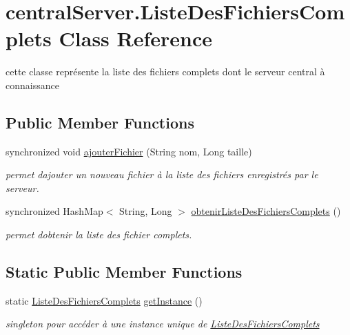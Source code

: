 \hypertarget{classcentralServer_1_1ListeDesFichiersComplets}{}\section{central\+Server.\+Liste\+Des\+Fichiers\+Complets Class Reference}
\label{classcentralServer_1_1ListeDesFichiersComplets}


cette classe représente la liste des fichiers complets dont le serveur central à connaissance  


\subsection*{Public Member Functions}
\begin{DoxyCompactItemize}
\item 
synchronized void \hyperlink{classcentralServer_1_1ListeDesFichiersComplets_a18c22fffc617f151f9ca3400d185dff9}{ajouter\+Fichier} (String nom, Long taille)
\begin{DoxyCompactList}\small\item\em permet d\textquotesingle{}ajouter un nouveau fichier à la liste des fichiers enregistrés par le serveur. \end{DoxyCompactList}\item 
synchronized Hash\+Map$<$ String, Long $>$ \hyperlink{classcentralServer_1_1ListeDesFichiersComplets_a333cc85a4c4d342123ee286b30e7a14e}{obtenir\+Liste\+Des\+Fichiers\+Complets} ()
\begin{DoxyCompactList}\small\item\em permet d\textquotesingle{}obtenir la liste des fichier complets. \end{DoxyCompactList}\end{DoxyCompactItemize}
\subsection*{Static Public Member Functions}
\begin{DoxyCompactItemize}
\item 
static \hyperlink{classcentralServer_1_1ListeDesFichiersComplets}{Liste\+Des\+Fichiers\+Complets} \hyperlink{classcentralServer_1_1ListeDesFichiersComplets_af327a19fe5b37b2b1bc5cd0bf118af59}{get\+Instance} ()
\begin{DoxyCompactList}\small\item\em singleton pour accéder à une instance unique de \hyperlink{classcentralServer_1_1ListeDesFichiersComplets}{Liste\+Des\+Fichiers\+Complets} \end{DoxyCompactList}\end{DoxyCompactItemize}


